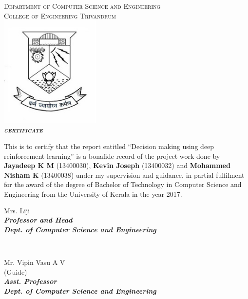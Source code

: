 \documentclass[a4paper,11pt]{report}
\begin{document}
	\begin{titlepage}
		\begin{centering}
			\textsc{\large{Department of Computer Science and Engineering}}\\
			\textsc{\large{College of Engineering Trivandrum}}\\[0.5cm]

			\includegraphics[width=5cm]{images/logo.jpg}\\[0.5cm]
			\textbf{\textit{\LARGE\textsc{{certificate}}}}\\[0.3cm]

		\end{centering}

		\begin{sloppypar}
		\large{This is to certify that the report entitled ``Decision making using deep reinforcement learning'' is a bonafide record of the project work done by \textbf{Jayadeep K M} (13400030), \textbf{Kevin Joseph} (13400032) and \textbf{Mohammed Nisham K} (13400038) under my supervision and guidance, in partial fulfilment for the award of the degree of Bachelor of Technology in Computer Science and Engineering from the University of Kerala in the year 2017.}\\[1.5cm]
		\end{sloppypar}

		\begin{minipage}{0.5\textwidth}
		\begin{flushleft}
		\begin{centering} \large
			\large{Mrs. Liji}\\
			\small{\textit{\textbf{Professor and Head}}}\\
			\small{\textit{\textbf{Dept. of Computer Science and Engineering}}}\\
		\end{centering}
		\end{flushleft}
		\end{minipage}
		~
		\begin{minipage}{0.5\textwidth}
		\begin{centering} \large
		\large{Mr. Vipin Vasu A V}\\
		\small{(Guide)}\\
		\small{\textit{\textbf{Asst. Professor}}}\\
		\small{\textit{\textbf{Dept. of Computer Science and Engineering}}}\\[1.5cm]


\end{centering}
\end{minipage}
\end{titlepage}
\end{document}
